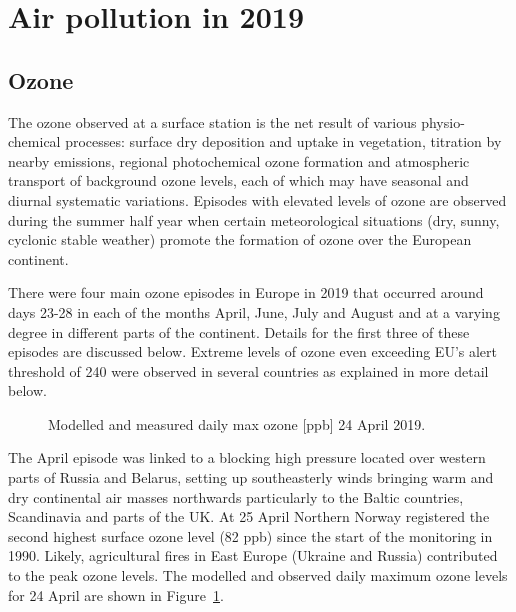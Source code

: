 \section{Air pollution in 2019} 
\subsection{Ozone}
\label{O3MAX}

The ozone observed at a surface station is the net result of various physio-chemical processes: surface dry deposition and uptake in vegetation, titration by nearby \nox emissions, regional photochemical ozone formation and atmospheric transport of background ozone levels, each of which may have seasonal and diurnal systematic variations. Episodes with elevated levels of ozone are observed during the summer half year when certain meteorological situations (dry, sunny, cyclonic stable weather) promote the formation of ozone over the European continent. 

There were four main ozone episodes in Europe in 2019 that occurred around days 23-28 in each of the months April, June, July and August and at a varying degree in different parts of the continent. Details for the first three of these episodes are discussed below. Extreme levels of ozone even exceeding EU's alert threshold of 240 \ug were observed in several countries as explained in more detail below.

\begin{figure}[H]
\caption{Modelled and measured daily max ozone [ppb] 24 April 2019.}
\label{fig:O3_20190424}
\end{figure}

The April episode was linked to a blocking high pressure located over western parts of Russia and Belarus, setting up southeasterly winds bringing warm and dry continental air masses northwards particularly to the Baltic countries, Scandinavia and parts of the UK. At 25 April Northern Norway registered the second highest surface ozone level (82 ppb) since the start of the monitoring in 1990. Likely, agricultural fires in East Europe (Ukraine and Russia) contributed to the peak ozone levels. The modelled and observed daily maximum ozone levels for 24 April are shown in Figure~\ref{fig:O3_20190424}. 

